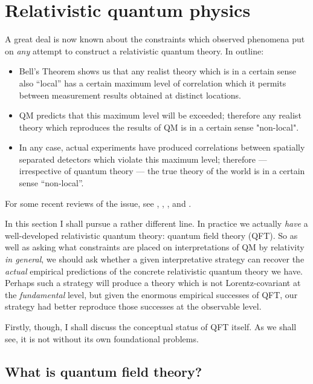 \documentclass[12pt]{article}
\begin{document}
\section{Relativistic quantum physics}\label{DMWWRQM}

A great deal is now known about the constraints which observed phenomena put on \emph{any} attempt to construct a relativistic quantum theory. In outline:
\begin{itemize}
\item Bell's Theorem shows us that any realist theory which is in a certain sense also ``local'' has a certain maximum level of correlation which it permits between measurement results obtained at distinct locations. 
\item QM predicts that this maximum level will be exceeded; therefore any realist theory which reproduces the results of QM is in a certain sense "non-local".
\item In any case, actual experiments have produced correlations between spatially separated detectors which violate this maximum level; therefore --- irrespective of quantum theory --- the true theory of the world is in a certain sense ``non-local''.
\end{itemize}
For some recent reviews of the issue, see , , ,  and . 

In this section I shall pursue a rather different line. In practice we actually \emph{have} a well-developed relativistic quantum theory: quantum field theory (QFT). So as well as asking what constraints are placed on interpretations of QM by relativity \emph{in general}, we should ask whether a given interpretative strategy can recover the \emph{actual} empirical predictions of the concrete relativistic quantum theory we have. Perhaps such a strategy will produce a theory which is not Lorentz-covariant at the \emph{fundamental} level, but given the enormous empirical successes of QFT, our strategy had better reproduce those successes at the observable level.

Firstly, though, I shall discuss the conceptual status of QFT itself. As we shall see, it is not without its own foundational problems.

\subsection{What is quantum field theory?}
\end{document}

